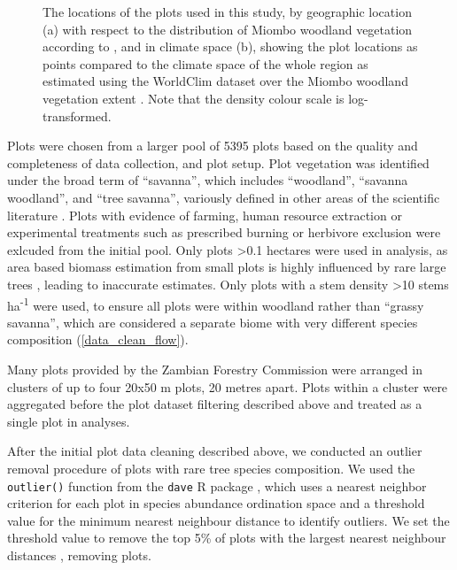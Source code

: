 \documentclass[11pt,a4paper]{article}
\begin{document}
\begin{figure}[H]
	\centering
    \qquad
{}%
\caption{The locations of the \nplots{} plots used in this study, by geographic location (a) with respect to the distribution of Miombo woodland vegetation according to \citet{White1987}, and in climate space (b), showing the plot locations as points compared to the climate space of the whole region as estimated using the WorldClim dataset over the Miombo woodland vegetation extent \citep{Fick2017}. Note that the density colour scale is log-transformed.}
\end{figure}

Plots were chosen from a larger pool of 5395 plots based on the quality and completeness of data collection, and plot setup. Plot vegetation was identified under the broad term of ``savanna'', which includes ``woodland'', ``savanna woodland'', and ``tree savanna'', variously defined in other areas of the scientific literature \citep{Ratnam2011, Hill2010}. Plots with evidence of farming, human resource extraction or experimental treatments such as prescribed burning or herbivore exclusion were exlcuded from the initial pool. Only plots >0.1 hectares were used in analysis, as area based biomass estimation from small plots is highly influenced by rare large trees \citep{}, leading to inaccurate estimates. Only plots with a stem density >10 stems ha\textsuperscript{-1} were used, to ensure all plots were within woodland rather than ``grassy savanna'', which are considered a separate biome with very different species composition \citep{Parr2014} (\autoref{data_clean_flow}).

Many plots provided by the Zambian Forestry Commission were arranged in clusters of up to four 20x50 m plots, 20 metres apart. Plots within a cluster were aggregated before the plot dataset filtering described above and treated as a single plot in analyses.

After the initial plot data cleaning described above, we conducted an outlier removal procedure of plots with rare tree species composition. We used the \verb|outlier()| function from the \verb|dave| R package \citep{dave}, which uses a nearest neighbor criterion for each plot in species abundance ordination space and a threshold value for the minimum nearest neighbour distance to identify outliers. We set the threshold value to remove the top 5\% of plots with the largest nearest neighbour distances \citep{Otto}, removing \noutliers{} plots.
\end{document}
